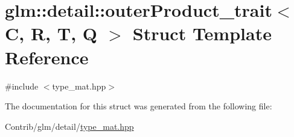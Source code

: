 \hypertarget{structglm_1_1detail_1_1outer_product__trait}{}\section{glm\+:\+:detail\+:\+:outer\+Product\+\_\+trait$<$ C, R, T, Q $>$ Struct Template Reference}
\label{structglm_1_1detail_1_1outer_product__trait}


{\ttfamily \#include $<$type\+\_\+mat.\+hpp$>$}



The documentation for this struct was generated from the following file\+:\begin{DoxyCompactItemize}
\item 
Contrib/glm/detail/\mbox{\hyperlink{type__mat_8hpp}{type\+\_\+mat.\+hpp}}\end{DoxyCompactItemize}
